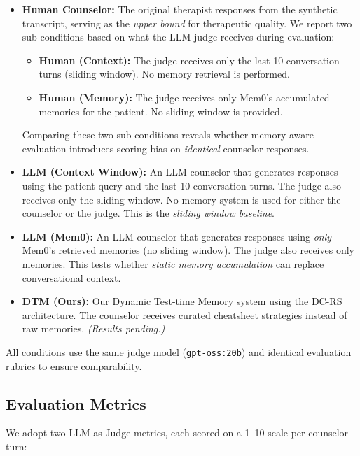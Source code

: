 \documentclass{article} %
\begin{document}
\begin{itemize}
    \item \textbf{Human Counselor:} The original therapist responses from the synthetic transcript, serving as the \emph{upper bound} for therapeutic quality. We report two sub-conditions based on what the LLM judge receives during evaluation:
    \begin{itemize}
        \item \textbf{Human (Context):} The judge receives only the last 10 conversation turns (sliding window). No memory retrieval is performed.
        \item \textbf{Human (Memory):} The judge receives only Mem0's accumulated memories for the patient. No sliding window is provided.
    \end{itemize}
    Comparing these two sub-conditions reveals whether memory-aware evaluation introduces scoring bias on \emph{identical} counselor responses.
    \item \textbf{LLM (Context Window):} An LLM counselor that generates responses using the patient query and the last 10 conversation turns. The judge also receives only the sliding window. No memory system is used for either the counselor or the judge. This is the \emph{sliding window baseline}.
    \item \textbf{LLM (Mem0):} An LLM counselor that generates responses using \emph{only} Mem0's retrieved memories (no sliding window). The judge also receives only memories. This tests whether \emph{static memory accumulation} can replace conversational context.
    \item \textbf{DTM (Ours):} Our Dynamic Test-time Memory system using the DC-RS architecture. The counselor receives curated cheatsheet strategies instead of raw memories. \textit{(Results pending.)}
\end{itemize}

All conditions use the same judge model (\texttt{gpt-oss:20b}) and identical evaluation rubrics to ensure comparability.

\subsection{Evaluation Metrics}

We adopt two LLM-as-Judge metrics, each scored on a 1--10 scale per counselor turn:
\end{document}
